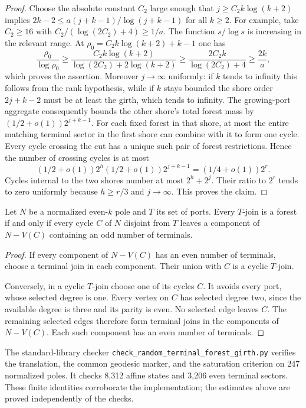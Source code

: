 \begin{proof}
Choose the absolute constant $C_2$ large enough that
$j\ge C_2 k\log(k+2)$ implies
$2k-2\le a(j+k-1)/\log(j+k-1)$ for all $k\ge2$.
For example, take $C_2\ge16$ with $C_2/(\log(2C_2)+4)\ge1/a$.
The function $s/\log s$ is increasing in the relevant range.
At $\rho_0=C_2 k\log(k+2)+k-1$ one has
\[
 \frac{\rho_0}{\log\rho_0}
 \ge
 \frac{C_2 k\log(k+2)}{\log(2C_2)+2\log(k+2)}
 \ge\frac{2C_2 k}{\log(2C_2)+4}
 \ge\frac{2k}{a},
\]
which proves the assertion.
Moreover $j\to\infty$ uniformly: if $k$ tends to infinity this follows from the rank hypothesis, while if $k$ stays bounded the shore order $2j+k-2$ must be at least the girth, which tends to infinity.
The growing-port aggregate consequently bounds the other shore's total forest mass by
$(1/2+o(1))2^{j+k-1}$.
For each fixed forest in that shore, at most the entire matching terminal sector in the first shore can combine with it to form one cycle.
Every cycle crossing the cut has a unique such pair of forest restrictions.
Hence the number of crossing cycles is at most
\[
 (1/2+o(1))2^h
 (1/2+o(1))2^{j+k-1}
 = (1/4+o(1))2^r.
\]
Cycles internal to the two shores number at most $2^h+2^j$.
Their ratio to $2^r$ tends to zero uniformly because $h\ge r/3$ and $j\to\infty$.
This proves the claim.
\end{proof}

\begin{proposition}
\label{prop:random-full-terminal-forest-criterion}
Let $N$ be a normalized even-$k$ pole and $T$ its set of ports.
Every $T$-join is a forest if and only if every cycle $C$ of $N$ disjoint from $T$ leaves a component of $N-V(C)$ containing an odd number of terminals.
\end{proposition}

\begin{proof}
If every component of $N-V(C)$ has an even number of terminals, choose a terminal join in each component.
Their union with $C$ is a cyclic $T$-join.

Conversely, in a cyclic $T$-join choose one of its cycles $C$.
It avoids every port, whose selected degree is one.
Every vertex on $C$ has selected degree two, since the available degree is three and its parity is even.
No selected edge leaves $C$.
The remaining selected edges therefore form terminal joins in the components of $N-V(C)$.
Each such component has an even number of terminals.
\end{proof}

The standard-library checker \texttt{check\_random\_terminal\_forest\_girth.py}
verifies the translation, the common geodesic marker, and the saturation criterion
on 247 normalized poles.
It checks 8,312 affine states and 3,206 even terminal sectors.
These finite identities corroborate the implementation; the estimates above are proved independently of the checks.
